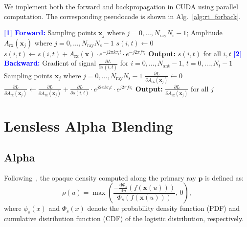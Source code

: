 We implement both the forward and backpropagation in CUDA using parallel computation. The corresponding pseudocode is shown in Alg.~\ref{alg:rt_forback}.

\begin{algorithm}[H]
\caption{Signal Tracing}
\begin{algorithmic}
\State \textbf{\textcolor{blue}{[1] Forward:}} Sampling points $\mathbf{x}_j$ where $j = 0, \ldots, N_{\text{ray}} N_{\text{s}} - 1$;
\State Amplitude $A_\text{rx}(\mathbf{x}_j)$ where $j = 0, \ldots, N_{\text{ray}} N_{\text{s}} - 1$
        \State $s(i, t) \gets 0$
            \State $s(i, t) \gets s(i, t) + A_{\text{rx}}(\mathbf{x}) \cdot e^{-j 2\pi k \tau_i t} \cdot e^{-j 2\pi f \tau_i}$
        \EndFor
    \EndFor
\EndFor
\State \textbf{Output:} $s(i, t)$ for all $i, t$
\State \textbf{\textcolor{blue}{[2] Backward:}} Gradient of signal $\frac{\partial L}{\partial s(i, t)}$ for $i = 0, \ldots, N_{\text{ant}} - 1$, $t = 0, \ldots, N_t - 1$
\State Sampling points $\mathbf{x}_j$ where $j = 0, \ldots, N_{\text{ray}} N_{\text{s}} - 1$
    \State $\frac{\partial L}{\partial A_{\text{rx}}(\mathbf{x}_j)} \gets 0$
            \State $\frac{\partial L}{\partial A_{\text{rx}}(\mathbf{x}_j)} \gets \frac{\partial L}{\partial A_{\text{rx}}(\mathbf{x}_j)} + \frac{\partial L}{\partial s(i, t)} \cdot e^{j 2\pi k \tau_i t} \cdot e^{j 2\pi f \tau_i}$
        \EndFor
    \EndFor
\EndFor
\State \textbf{Output:} $\frac{\partial L}{\partial A_{\text{rx}}(\mathbf{x}_j)}$ for all $j$

\end{algorithmic}
\label{alg:rt_forback}
\end{algorithm}

\section{Lensless Alpha Blending}
\label{sec:app-alpha-blending}
\subsection{Alpha} 
\label{sec:app-alpha-blending-alpha}
Following~\cite{wang2021neus}, the opaque density computed along the primary ray \( \mathbf{p} \) is defined as:
\begin{equation}
    \rho(u) = \max\left(
    \frac{-\frac{\mathrm{d}\Phi_s}{\mathrm{d}u}(f(\mathbf{x}(u)))}{\Phi_s(f(\mathbf{x}(u)))},\, 0
    \right),
\end{equation}
where \( \phi_s(x) \) and \( \Phi_s(x) \) denote the probability density function (PDF) and cumulative distribution function (CDF) of the logistic distribution, respectively.

